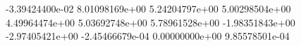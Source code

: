  -3.39424400e-02
 8.01098169e+00
 5.24204797e+00
 5.00298504e+00
 4.49964474e+00
 5.03692748e+00
 5.78961528e+00
 -1.98351843e+00
 -2.97405421e+00
 -2.45466679e-04
 0.00000000e+00
 9.85578501e-04
